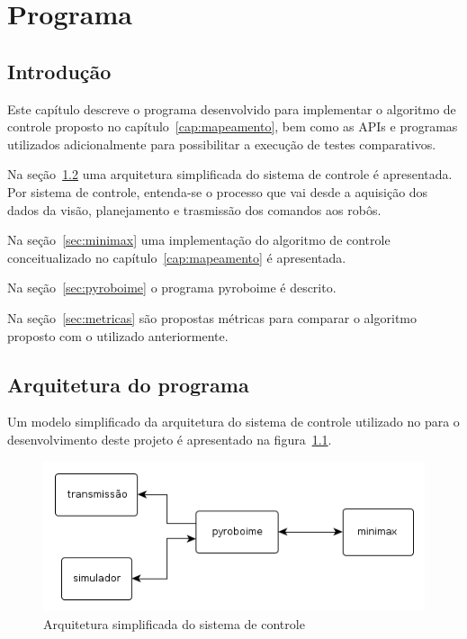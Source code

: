 \chapter{Programa}\label{cap:programa}

\section{Introdução}

Este capítulo descreve o programa desenvolvido para implementar o algoritmo de
controle proposto no capítulo~\ref{cap:mapeamento}, bem como as APIs e programas
utilizados adicionalmente para possibilitar a execução de testes comparativos.

Na seção~\ref{sec:arq_prog} uma arquitetura simplificada do sistema de controle é apresentada.
Por sistema de controle, entenda-se o processo que vai desde a aquisição dos
dados da visão, planejamento e trasmissão dos comandos aos robôs.

Na seção~\ref{sec:minimax} uma implementação do algoritmo de controle conceitualizado no
capítulo~\ref{cap:mapeamento} é apresentada.

Na seção~\ref{sec:pyroboime} o programa pyroboime é descrito.

Na seção~\ref{sec:metricas} são propostas métricas para comparar o algoritmo
proposto com o utilizado anteriormente.

\section{Arquitetura do programa}\label{sec:arq_prog}

Um modelo simplificado da arquitetura do sistema de controle utilizado no para
o desenvolvimento deste projeto é apresentado na figura~\ref{fig:arq_prog}.

\begin{figure}
  \centering
  \includegraphics[width=0.8 \linewidth]{img/arq_geral_prog}
  \caption{Arquitetura simplificada do sistema de controle}\label{fig:arq_prog}
\end{figure}

